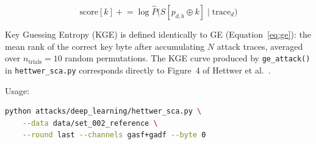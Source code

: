 \begin{equation}
  \mathrm{score}[k] \mathrel{+}=
    \log \hat{P}\!\bigl(S[p_{d,b} \oplus k] \;\big|\; \text{trace}_d\bigr)
  \label{eq:kge_score}
\end{equation}

Key Guessing Entropy (KGE) is defined identically to GE
(Equation~\ref{eq:ge}): the mean rank of the correct key byte after
accumulating $N$ attack traces, averaged over $n_\text{trials}=10$ random
permutations.
The KGE curve produced by \texttt{ge\_attack()} in
\texttt{hettwer\_sca.py} corresponds directly to Figure~4 of
Hettwer et al.~\cite{hettwer2020encoding}.

Usage:
\begin{lstlisting}[language=bash, caption={Train and evaluate Hettwer CNN}]
python attacks/deep_learning/hettwer_sca.py \
    --data data/set_002_reference \
    --round last --channels gasf+gadf --byte 0
\end{lstlisting}
